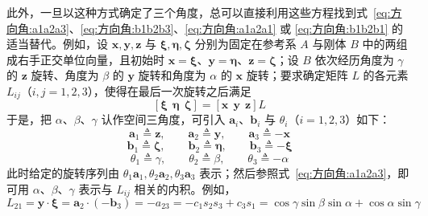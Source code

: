 此外，一旦以这种方式确定了三个角度，总可以直接利用这些方程找到式~\eqref{eq:方向角:a1a2a3}、\eqref{eq:方向角:b1b2b3}、\eqref{eq:方向角:a1a2a1} 或 \eqref{eq:方向角:b1b2b1} 的适当替代。例如，设 $\mathbf{x},\mathbf{y},\mathbf{z}$ 与 $\bm{\xi},\bm{\eta},\bm{\zeta}$ 分别为固定在参考系 $A$ 与刚体 $B$ 中的两组成右手正交单位向量，且初始时 $\mathbf{x}=\bm{\xi}$、$\mathbf{y}=\bm{\eta}$、$\mathbf{z}=\bm{\zeta}$；设 $B$ 依次经历角度为 $\gamma$ 的 $\mathbf{z}$ 旋转、角度为 $\beta$ 的 $\mathbf{y}$ 旋转和角度为 $\alpha$ 的 $\mathbf{x}$ 旋转；要求确定矩阵 $L$ 的各元素 $L_{ij}$（$i,j=1,2,3$），使得在最后一次旋转之后满足
$$
[\bm{\xi}\ \ \bm{\eta}\ \ \bm{\zeta}]=[\mathbf{x}\ \ \mathbf{y}\ \ \mathbf{z}]L
$$
于是，把 $\alpha$、$\beta$、$\gamma$ 认作空间三角度，可引入 $\mathbf{a}_i$、$\mathbf{b}_i$ 与 $\theta_i$（$i=1,2,3$）如下：
$$
\mathbf{a}_1\triangleq\mathbf{z},\qquad \mathbf{a}_2\triangleq\mathbf{y},\qquad \mathbf{a}_3\triangleq-\mathbf{x}
$$
$$
\mathbf{b}_1\triangleq\bm{\zeta},\qquad \mathbf{b}_2\triangleq\bm{\eta},\qquad \mathbf{b}_3\triangleq-\bm{\xi}
$$
$$
\theta_1\triangleq\gamma,\qquad \theta_2\triangleq\beta,\qquad \theta_3\triangleq-\alpha
$$
此时给定的旋转序列由 $\theta_1\mathbf{a}_1,\theta_2\mathbf{a}_2,\theta_3\mathbf{a}_3$ 表示；然后参照式~\eqref{eq:方向角:a1a2a3}，即可用 $\alpha$、$\beta$、$\gamma$ 表示与 $L_{ij}$ 相关的内积。例如，
$$
L_{21}=\mathbf{y}\cdot\bm{\xi}=\mathbf{a}_2\cdot(-\mathbf{b}_3)=-a_{23}=-c_1s_2s_3+c_3s_1=\cos\gamma\sin\beta\sin\alpha+\cos\alpha\sin\gamma
$$
